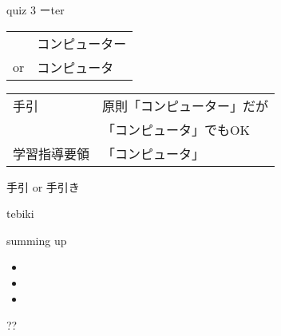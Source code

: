 \documentclass[
  ignorenonframetext,
]{beamer}
\begin{document}
\begin{frame}{quiz 3 ーter}
\protect\hypertarget{quiz-3-ux30fcter}{}
\Huge

\begin{tabular}{@{}ll@{}}
&コンピューター\\
or&コンピュータ
\end{tabular}

\pause

\vfill

\large
\raggedleft
\begin{tabular}{@{}ll@{}}\toprule
手引&原則「コンピューター」だが\\
&「コンピュータ」でもOK\\\pause
学習指導要領&「コンピュータ」\\\bottomrule
\end{tabular}
\pause

\vfill
\end{frame}

\begin{frame}{手引 or 手引き}
\protect\hypertarget{ux624bux5f15-or-ux624bux5f15ux304d}{}
\end{frame}

\begin{frame}{tebiki}
\protect\hypertarget{tebiki-1}{}
\vspace*{-20pt}
\end{frame}

\begin{frame}{summing up}
\protect\hypertarget{summing-up}{}
\Huge

\begin{itemize}
\item  \scalebox{1.4}{根拠}\pause
\item  \scalebox{1.4}{簡潔さ}\pause
\item  \scalebox{1.4}{スピード感}
\end{itemize}
\end{frame}

\begin{frame}{??}
\protect\hypertarget{section-4}{}
\Huge

\end{frame}
\end{document}

